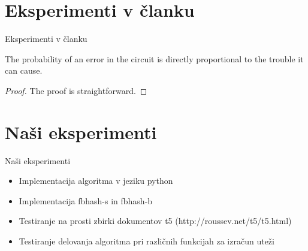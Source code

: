 \documentclass[xcolor=dvipsnames,compress]{beamer}
\begin{document}
\section{Eksperimenti v članku}
\label{sec:eksoni}

\begin{frame}{Eksperimenti v članku}
\begin{theorem}
  The probability of an error in the circuit is directly proportional
      to the trouble it can cause.
\end{theorem}
\pause
\begin{proof}
 The proof is straightforward.
\end{proof}
\end{frame}

\section{Naši eksperimenti}
\label{sec:eksmi}
\begin{frame}{Naši eksperimenti}
    \begin{itemize}
        \item Implementacija algoritma v jeziku python
        \item Implementacija fbhash-s in fbhash-b
        \item Testiranje na prosti zbirki dokumentov t5 (http://roussev.net/t5/t5.html)
        \item Testiranje delovanja algoritma pri različnih funkcijah za izračun uteži
    \end{itemize}
    \end{frame}
    
\end{document}
